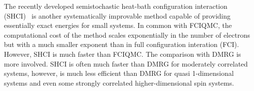 \documentclass[%
reprint,
 superscriptaddress,
 amsmath,amssymb,
 aps,
]{revtex4-1}
\begin{document}
The recently developed semistochastic heat-bath configuration interaction (SHCI)~\cite{HolTubUmr-JCTC-16,ShaHolJeaAlaUmr-JCTC-17,HolUmrSha-JCP-17,SmiMusHolSha-JCTC-17,MusSha-JCTC-17,ChiHolOttUmrShaZim-JPCA-18} is another systematically improvable method capable of providing essentially exact energies for small systems.
In common with FCIQMC, the computational cost of the method scales exponentially in the number of electrons but with a
much smaller exponent than in full configuration interation (FCI).  However, SHCI is much faster than FCIQMC.
The comparison with DMRG is more involved.  SHCI is often much faster than DMRG for moderately correlated systems,
however, is much less efficient than DMRG for quasi 1-dimensional systems and even some strongly correlated 
higher-dimensional spin systems. %
\end{document}
